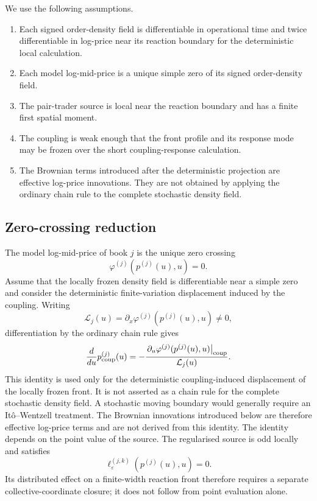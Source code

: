 \documentclass[5p,final]{elsarticle}
\begin{document}
We use the following assumptions.
\begin{enumerate}
\item[(B1)] Each signed order-density field is differentiable in operational time and twice differentiable in log-price near its reaction boundary for the deterministic local calculation.
\item[(B2)] Each model log-mid-price is a unique simple zero of its signed order-density field.
\item[(B3)] The pair-trader source is local near the reaction boundary and has a finite first spatial moment.
\item[(B4)] The coupling is weak enough that the front profile and its response mode may be frozen over the short coupling-response calculation.
\item[(B5)] The Brownian terms introduced after the deterministic projection are effective log-price innovations. They are not obtained by applying the ordinary chain rule to the complete stochastic density field.
\end{enumerate}

\subsection{Zero-crossing reduction}

The model log-mid-price of book $j$ is the unique zero crossing
\begin{equation}
    \varphi^{(j)}(p^{(j)}(u),u)=0.
\end{equation}
Assume that the locally frozen density field is differentiable near a simple zero and consider the deterministic finite-variation displacement induced by the coupling. Writing
\begin{equation}
    \mathcal L_j(u)=\partial_x\varphi^{(j)}(p^{(j)}(u),u)\neq0,
\end{equation}
differentiation by the ordinary chain rule gives
\begin{equation}
    \frac{d}{du}p_{\rm coup}^{(j)}(u)
    =-\frac{\left.\partial_u\varphi^{(j)}(p^{(j)}(u),u)\right|_{\rm coup}}
    {\mathcal L_j(u)}.
\end{equation}
This identity is used only for the deterministic coupling-induced displacement of the locally frozen front. It is not asserted as a chain rule for the complete stochastic density field. A stochastic moving boundary would generally require an It\^{o}--Wentzell treatment. The Brownian innovations introduced below are therefore effective log-price terms and are not derived from this identity. The identity depends on the point value of the source. The regularised source is odd locally and satisfies
\begin{equation}
    \ell_\varepsilon^{(j,k)}(p^{(j)}(u),u)=0.
\end{equation}
Its distributed effect on a finite-width reaction front therefore requires a separate collective-coordinate closure; it does not follow from point evaluation alone.
\end{document}
